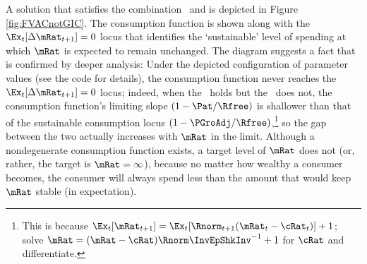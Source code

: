 \documentclass[BufferStockTheory]{subfiles}
\begin{document}
A solution that satisfies the combination \FVAC~and
\cncl{\GIC} is depicted in Figure \ref{fig:FVACnotGIC}.  The
consumption function is shown along with the $\Ex_{t}[\Delta
\mRat_{t+1}]=0$ locus that identifies the `sustainable' level of
spending at which $\mRat$ is expected to remain unchanged.  The
diagram suggests a fact that is confirmed by deeper analysis: Under
the depicted configuration of parameter values (see the code for details), the consumption function never reaches the
$\Ex_{t}[\Delta \mRat_{t+1}]=0$ locus; indeed, when the \RIC~holds but
the \GIC~does not, the consumption function's limiting slope
$(1-\Pat/\Rfree)$ is shallower than that of the sustainable consumption
locus $(1-\PGroAdj/\Rfree)$,\footnote{This is because
  $\Ex_{t}[\mRat_{t+1}]=\Ex_{t}[\Rnorm_{t+1}(\mRat_{t}-\cRat_{t})]+1$; solve $\mRat = (\mRat - \cRat)\Rnorm \InvEpShkInv^{-1}+1$ for $\cRat$ and differentiate.}
so the gap between the two actually increases with $\mRat$ in the
limit.  Although a nondegenerate consumption function
exists, a target level of $\mRat$ does not (or, rather, the
target is $\mRat=\infty$), because no matter how wealthy a consumer
becomes, the consumer will always spend less than the amount that
would keep $\mRat$ stable (in expectation).

\renewcommand{\figFile}{FVACnotGIC}
\hypertarget{\figFile}{}


\begin{comment}
  The foregoing has some connection with the theoretical results in
  Szeidl~\citeyearpar{szeidlInvariant}, who shows that the condition we
  call the \GIC~guarantees that $\mRat$ will have an asymptotically
  bounded mean.  He also shows that under these circumstances $\mRat$
  satisfies conditions he proves to be necessary for the existence of a
  stable invariant distribution.  Furthermore, $\aRat$, $\bRat$, and $\cRat$
  are also shown to have stable invariant distributions and asymptotically
  bounded means.  We make use of these results below.
\end{comment}

\begin{comment} %
  A final point worth reemphasizing is that neither the Return
  Impatience Condition nor the Finite Human Wealth Condition was
  required for the contraction mapping proof.  Both these conditions are
  necessary for a nondegenerate solution to exist in the unconstrained
  perfect foresight case.  This is noteworthy because in some models and
  in many economists' intuition, the introduction of uncertainty reduces
  the space of parameter values for which a unique solution exists;
  here, precisely the opposite occurs.  Indeed, many of the
  parameterizations newly eligible for solution are quite plausible, so
  this observation is not merely a curiosum but of real practical
  value.\footnote{An easy example of a case where the perfect foresight
    model has no solution is where $\Rfree >1$, $\DiscFac = 1/\Rfree$
    and $\PGro > \Rfree$.}
\end{comment}
\end{document}
